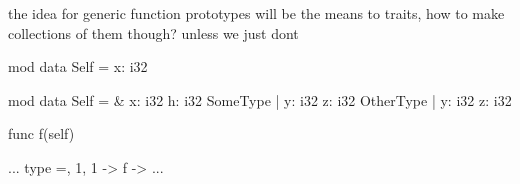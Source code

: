 \documentclass{article}
\begin{document}
		the idea for generic function prototypes will be the means to traits, how to make collections of them though? unless we just dont 



		mod 
			data Self = 
				x: i32 

		mod 
			data Self = 
				\& 
					x: i32 
					h: i32
				SomeType | 
					y: i32
					z: i32
				OtherType | 
					y: i32
					z: i32

		
			func f(self)

			...
				type =, 1, 1 -> f -> ...
\end{document}

